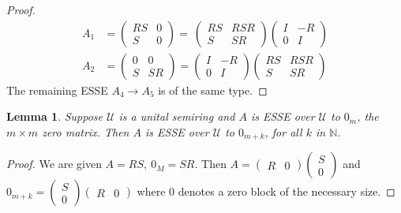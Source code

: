 \documentclass{amsart}
\newtheorem{lemma}[theorem]{Lemma}
\theoremstyle{definition}
\theoremstyle{remark}
\numberwithin{equation}{section}
\begin{document}
{{\begin{proof}
\begin{align*}  
A_1  & = 
  \begin{pmatrix} RS  & 0  \\ S & 0 \end{pmatrix} 
 =  \ 
  \begin{pmatrix} RS  & RSR \\  S  & SR  \end{pmatrix} 
  \begin{pmatrix} I  & -R \\ 0  & I  \end{pmatrix}  \\
A_2  & = 
  \begin{pmatrix} 0  & 0 \\ S & SR  \end{pmatrix} 
 =  
  \begin{pmatrix} I  & -R \\ 0  & I  \end{pmatrix} 
  \begin{pmatrix} RS  & RSR \\  S  & SR  \end{pmatrix} 
\end{align*} 
The remaining ESSE $A_4\to A_5$ is of the same type. 
\end{proof} 

\begin{lemma} \label{longzerotoonezero} 
Suppose $\mathcal U$ is a unital semiring and $A$ is ESSE over 
$\mathcal U$ to $0_m$, the $m\times m$ zero matrix. 
Then $A$ is ESSE over $\mathcal U$ to $0_{m+k}$, for 
all $k$ in $\mathbb N$. 
\end{lemma} 
\begin{proof} 
We are given $A=RS,\  0_M = SR$. Then 
$A= 
\left(
\begin{smallmatrix} R & 0 
\end{smallmatrix}
\right) 
\left(
\begin{smallmatrix} S \\ 0 
\end{smallmatrix}
\right) 
$ 
and 
$0_{m+k}= 
\left(
\begin{smallmatrix} S \\ 0 
\end{smallmatrix}
\right) 
\left(
\begin{smallmatrix} R & 0 
\end{smallmatrix}
\right) 
$ 
where $0$ denotes a zero block of the necessary size. 
\end{proof} 

}}
\end{document}
